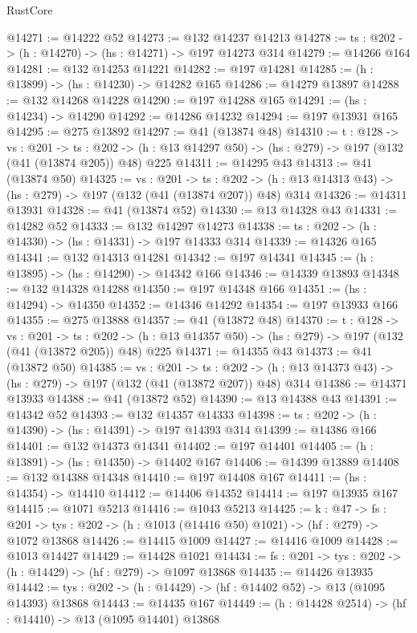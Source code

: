 \begin{lexlean}{RustCore}
\begin{coremodule}
@14271 := @14222 @52
@14273 := @132 @14237 @14213
@14278 := {ts : @202} -> (h : @14270) -> (hs : @14271) -> @197 @14273 @314
@14279 := @14266 @164
@14281 := @132 @14253 @14221
@14282 := @197 @14281
@14285 := (h : @13899) -> (hs : @14230) -> @14282 @165
@14286 := @14279 @13897
@14288 := @132 @14268 @14228
@14290 := @197 @14288 @165
@14291 := (hs : @14234) -> @14290
@14292 := @14286 @14232
@14294 := @197 @13931 @165
@14295 := @275 @13892
@14297 := @41 (@13874 @48)
@14310 := {t : @128} ->
  {vs : @201} ->
  {ts : @202} -> (h : @13 @14297 @50) -> (hs : @279) -> @197 (@132 (@41 (@13874 @205)) @48) @225
@14311 := @14295 @43
@14313 := @41 (@13874 @50)
@14325 := {vs : @201} ->
  {ts : @202} -> (h : @13 @14313 @43) -> (hs : @279) -> @197 (@132 (@41 (@13874 @207)) @48) @314
@14326 := @14311 @13931
@14328 := @41 (@13874 @52)
@14330 := @13 @14328 @43
@14331 := @14282 @52
@14333 := @132 @14297 @14273
@14338 := {ts : @202} -> (h : @14330) -> (hs : @14331) -> @197 @14333 @314
@14339 := @14326 @165
@14341 := @132 @14313 @14281
@14342 := @197 @14341
@14345 := (h : @13895) -> (hs : @14290) -> @14342 @166
@14346 := @14339 @13893
@14348 := @132 @14328 @14288
@14350 := @197 @14348 @166
@14351 := (hs : @14294) -> @14350
@14352 := @14346 @14292
@14354 := @197 @13933 @166
@14355 := @275 @13888
@14357 := @41 (@13872 @48)
@14370 := {t : @128} ->
  {vs : @201} ->
  {ts : @202} -> (h : @13 @14357 @50) -> (hs : @279) -> @197 (@132 (@41 (@13872 @205)) @48) @225
@14371 := @14355 @43
@14373 := @41 (@13872 @50)
@14385 := {vs : @201} ->
  {ts : @202} -> (h : @13 @14373 @43) -> (hs : @279) -> @197 (@132 (@41 (@13872 @207)) @48) @314
@14386 := @14371 @13933
@14388 := @41 (@13872 @52)
@14390 := @13 @14388 @43
@14391 := @14342 @52
@14393 := @132 @14357 @14333
@14398 := {ts : @202} -> (h : @14390) -> (hs : @14391) -> @197 @14393 @314
@14399 := @14386 @166
@14401 := @132 @14373 @14341
@14402 := @197 @14401
@14405 := (h : @13891) -> (hs : @14350) -> @14402 @167
@14406 := @14399 @13889
@14408 := @132 @14388 @14348
@14410 := @197 @14408 @167
@14411 := (hs : @14354) -> @14410
@14412 := @14406 @14352
@14414 := @197 @13935 @167
@14415 := @1071 @5213
@14416 := @1043 @5213
@14425 := {k : @47} ->
  {fs : @201} -> {tys : @202} -> (h : @1013 (@14416 @50) @1021) -> (hf : @279) -> @1072 @13868
@14426 := @14415 @1009
@14427 := @14416 @1009
@14428 := @1013 @14427
@14429 := @14428 @1021
@14434 := {fs : @201} -> {tys : @202} -> (h : @14429) -> (hf : @279) -> @1097 @13868
@14435 := @14426 @13935
@14442 := {tys : @202} -> (h : @14429) -> (hf : @14402 @52) -> @13 (@1095 @14393) @13868
@14443 := @14435 @167
@14449 := (h : @14428 @2514) -> (hf : @14410) -> @13 (@1095 @14401) @13868

\end{coremodule}
\end{lexlean}
